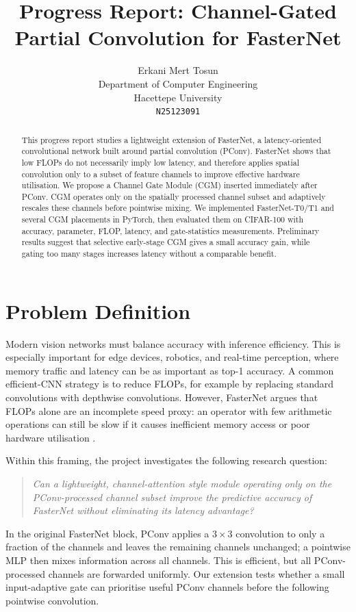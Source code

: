 \documentclass{article}
\title{Progress Report: Channel-Gated Partial Convolution for FasterNet}
\author{
Erkani Mert Tosun \\
Department of Computer Engineering \\
Hacettepe University \\
\texttt{N25123091}
}
\begin{document}
\maketitle

\begin{abstract}
This progress report studies a lightweight extension of FasterNet, a latency-oriented convolutional network built around partial convolution (PConv). FasterNet shows that low FLOPs do not necessarily imply low latency, and therefore applies spatial convolution only to a subset of feature channels to improve effective hardware utilisation. We propose a Channel Gate Module (CGM) inserted immediately after PConv. CGM operates only on the spatially processed channel subset and adaptively rescales these channels before pointwise mixing. We implemented FasterNet-T0/T1 and several CGM placements in PyTorch, then evaluated them on CIFAR-100 with accuracy, parameter, FLOP, latency, and gate-statistics measurements. Preliminary results suggest that selective early-stage CGM gives a small accuracy gain, while gating too many stages increases latency without a comparable benefit.
\end{abstract}

\section{Problem Definition}

Modern vision networks must balance accuracy with inference efficiency. This is especially important for edge devices, robotics, and real-time perception, where memory traffic and latency can be as important as top-1 accuracy. A common efficient-CNN strategy is to reduce FLOPs, for example by replacing standard convolutions with depthwise convolutions. However, FasterNet argues that FLOPs alone are an incomplete speed proxy: an operator with few arithmetic operations can still be slow if it causes inefficient memory access or poor hardware utilisation \citep{chen2023fasternet}.

Within this framing, the project investigates the following research question:
\begin{quote}
\emph{Can a lightweight, channel-attention style module operating only on the PConv-processed channel subset improve the predictive accuracy of FasterNet without eliminating its latency advantage?}
\end{quote}
In the original FasterNet block, PConv applies a $3 \times 3$ convolution to only a fraction of the channels and leaves the remaining channels unchanged; a pointwise MLP then mixes information across all channels. This is efficient, but all PConv-processed channels are forwarded uniformly. Our extension tests whether a small input-adaptive gate can prioritise useful PConv channels before the following pointwise convolution.
\end{document}
